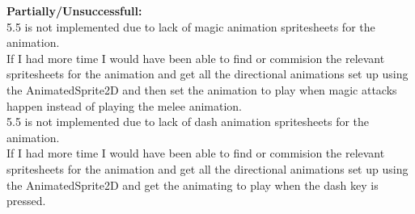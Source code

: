 \documentclass{article}
\begin{document}
        \textbf{Partially/Unsuccessfull:}\\
        5.5 is not implemented due to lack of magic animation spritesheets for the animation.\\
        If I had more time I would have been able to find or commision the relevant spritesheets for the animation and get all the directional animations set up using the AnimatedSprite2D and then set the animation to play when magic attacks happen instead of playing the melee animation.\\
        5.5 is not implemented due to lack of dash animation spritesheets for the animation.\\
        If I had more time I would have been able to find or commision the relevant spritesheets for the animation and get all the directional animations set up using the AnimatedSprite2D and get the animating to play when the dash key is pressed.\\
\end{document}
